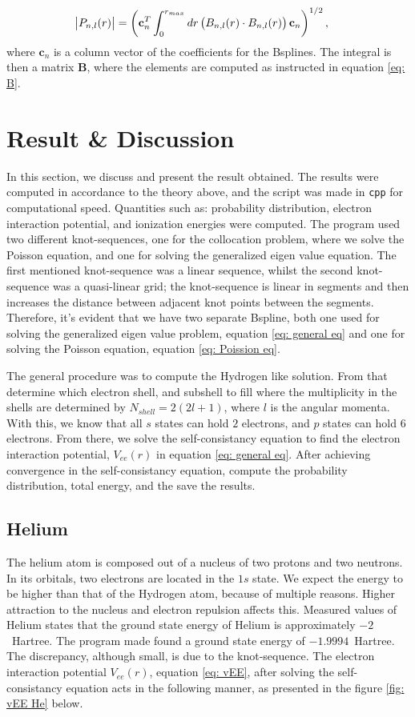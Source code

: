 \documentclass[a4paper]{article}
\newcommand{\newparagraph}{\vspace{.5cm}\noindent}
\begin{document}
\begin{align}
    \abs{P_{n,l}(r)} &= \left(\mathbf{c}_n^T\int_0^{r_{max}}dr\left(B_{n, l}(r)\cdot B_{n, l}(r)\right)\mathbf{c}_n\right)^{1/2},\label{eq: normalization}
\end{align}where $\mathbf{c}_n$ is a column vector of the coefficients for the Bsplines. The integral is then a matrix $\mathbf{B}$, where the elements are computed as instructed in equation \eqref{eq: B}.

\newpage
\section{Result \& Discussion}
In this section, we discuss and present the result obtained. The results were computed in accordance to the theory above, and the script was made in \verb|cpp| for computational speed. Quantities such as: probability distribution, electron interaction potential, and ionization energies were computed.
The program used two different knot-sequences, one for the collocation problem, where we solve the Poisson equation, and one for solving the generalized eigen value equation. The first mentioned knot-sequence was a linear sequence, whilst the second knot-sequence was a quasi-linear grid; the knot-sequence is linear in segments and then increases the distance between adjacent knot points between the segments. Therefore, it's evident that we have two separate Bspline, both one used for solving the generalized eigen value problem, equation \eqref{eq: general eq} and one for solving the Poisson equation, equation \eqref{eq: Poission eq}.

\newparagraph
The general procedure was to compute the Hydrogen like solution. From that determine which electron shell, and subshell to fill where the multiplicity in the shells are determined by $N_{shell} = 2(2l + 1)$, where $l$ is the angular momenta. With this, we know that all $s$ states can hold $2$ electrons, and $p$ states can hold $6$ electrons.
From there, we solve the self-consistancy equation to find the electron interaction potential, $V_{ee}(r)$ in equation \eqref{eq: general eq}.
After achieving convergence in the self-consistancy equation, compute the probability distribution, total energy, and the save the results.
\subsection{Helium}
The helium atom is composed out of a nucleus of two protons and two neutrons. In its orbitals, two electrons are located in the $1s$ state. We expect the energy to be higher than that of the Hydrogen atom, because of multiple reasons. Higher attraction to the nucleus and electron repulsion affects this.
Measured values of Helium states that the ground state energy of Helium is approximately $-2$~Hartree. The program made found a ground state energy of $-1.9994$~Hartree. The discrepancy, although small, is due to the knot-sequence.
The electron interaction potential $V_{ee}(r)$, equation \eqref{eq: vEE}, after solving the self-consistancy equation acts in the following manner, as presented in the figure \ref{fig: vEE He} below.
\end{document}
